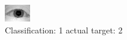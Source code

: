 \begin{figure}[h!]
\begin{center}
\includegraphics[width=0.60\columnwidth]{figures/ID951_class_1_target_2.png}
\end{center}
\caption{ Classification: 1 actual target: 2}
\label{fig:ID951_class_1_target_2}
\end{figure}
